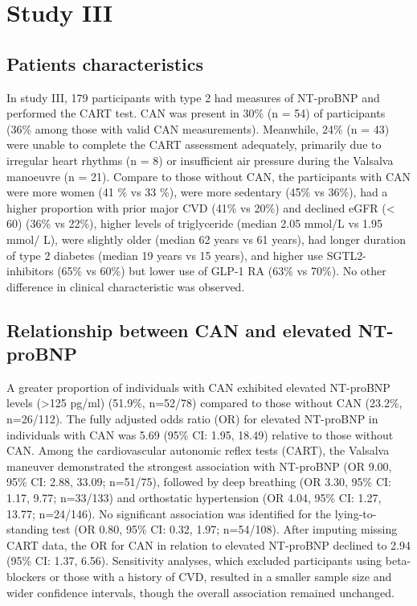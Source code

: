\documentclass[
  a4paper,
  headsepline=true,
  open=any]{scrbook}
\begin{document}
\hypertarget{study-iii-1}{%
\section{Study III}\label{study-iii-1}}

\hypertarget{patients-characteristics}{%
\subsection{Patients characteristics}\label{patients-characteristics}}

In study III, 179 participants with type 2 had measures of NT-proBNP and
performed the CART test. CAN was present in 30\% (n = 54) of
participants (36\% among those with valid CAN measurements). Meanwhile,
24\% (n = 43) were unable to complete the CART assessment adequately,
primarily due to irregular heart rhythms (n = 8) or insufficient air
pressure during the Valsalva manoeuvre (n = 21). Compare to those
without CAN, the participants with CAN were more women (41 \% vs 33 \%),
were more sedentary (45\% vs 36\%), had a higher proportion with prior
major CVD (41\% vs 20\%) and declined eGFR (\textless{} 60) (36\% vs
22\%), higher levels of triglyceride (median 2.05 mmol/L vs 1.95 mmol/
L), were slightly older (median 62 years vs 61 years), had longer
duration of type 2 diabetes (median 19 years vs 15 years), and higher
use SGTL2-inhibitors (65\% vs 60\%) but lower use of GLP-1 RA (63\% vs
70\%). No other difference in clinical characteristic was observed.

\hypertarget{relationship-between-can-and-elevated-nt-probnp}{%
\subsection{Relationship between CAN and elevated
NT-proBNP}\label{relationship-between-can-and-elevated-nt-probnp}}

A greater proportion of individuals with CAN exhibited elevated
NT-proBNP levels (\textgreater125 pg/ml) (51.9\%, n=52/78) compared to
those without CAN (23.2\%, n=26/112). The fully adjusted odds ratio (OR)
for elevated NT-proBNP in individuals with CAN was 5.69 (95\% CI: 1.95,
18.49) relative to those without CAN. Among the cardiovascular autonomic
reflex tests (CART), the Valsalva maneuver demonstrated the strongest
association with NT-proBNP (OR 9.00, 95\% CI: 2.88, 33.09; n=51/75),
followed by deep breathing (OR 3.30, 95\% CI: 1.17, 9.77; n=33/133) and
orthostatic hypertension (OR 4.04, 95\% CI: 1.27, 13.77; n=24/146). No
significant association was identified for the lying-to-standing test
(OR 0.80, 95\% CI: 0.32, 1.97; n=54/108). After imputing missing CART
data, the OR for CAN in relation to elevated NT-proBNP declined to 2.94
(95\% CI: 1.37, 6.56). Sensitivity analyses, which excluded participants
using beta-blockers or those with a history of CVD, resulted in a
smaller sample size and wider confidence intervals, though the overall
association remained unchanged.
\end{document}
